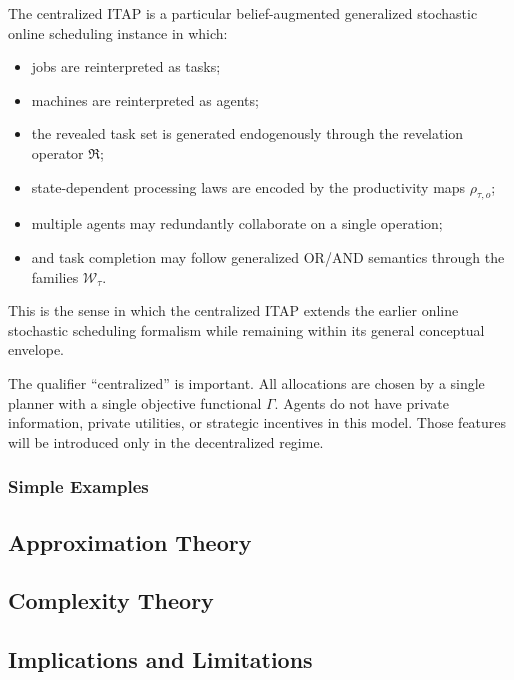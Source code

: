 \begin{remark}
The centralized ITAP is a particular belief-augmented generalized stochastic online scheduling instance in which:
\begin{itemize}
    \item jobs are reinterpreted as tasks;
    \item machines are reinterpreted as agents;
    \item the revealed task set is generated endogenously through the revelation operator \(\mathfrak R\);
    \item state-dependent processing laws are encoded by the productivity maps \(\rho_{\tau,o}\);
    \item multiple agents may redundantly collaborate on a single operation;
    \item and task completion may follow generalized OR/AND semantics through the families \(\mathcal W_\tau\).
\end{itemize}
This is the sense in which the centralized ITAP extends the earlier online stochastic scheduling formalism while remaining within its general conceptual envelope.
\end{remark}

\begin{remark}[Centralization]
The qualifier ``centralized'' is important. All allocations are chosen by a single planner with a single objective functional \(\Gamma\). Agents do not have private information, private utilities, or strategic incentives in this model. Those features will be introduced only in the decentralized regime.
\end{remark}

\subsubsection{Simple Examples}


\subsection{Approximation Theory}

\subsection{Complexity Theory}

\subsection{Implications and Limitations}


